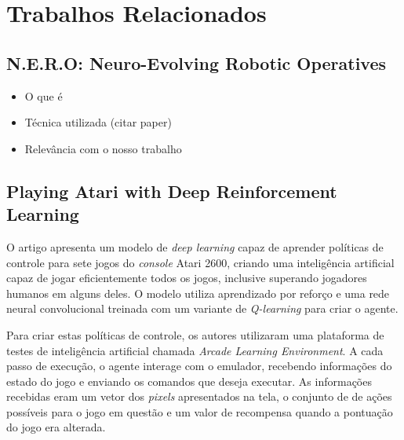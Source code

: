 \chapter{\label{chap:related-work}Trabalhos Relacionados}



\section{N.E.R.O: Neuro-Evolving Robotic Operatives}

\begin{mdframed}[backgroundcolor=green!20]
\begin{itemize}
    \item
        O que é
    \item
        Técnica utilizada (citar paper)
    \item
        Relevância com o nosso trabalho
\end{itemize}
\end{mdframed}

\section{Playing Atari with Deep Reinforcement Learning}
O artigo apresenta um modelo de \textit{deep learning} capaz de aprender
políticas de controle para sete jogos do \textit{console} Atari 2600, criando
uma inteligência artificial capaz de jogar eficientemente todos os jogos,
inclusive superando jogadores humanos em alguns deles. O modelo utiliza
aprendizado por reforço e uma rede neural convolucional treinada com um variante
de \textit{Q-learning} para criar o agente.

Para criar estas políticas de controle, os autores utilizaram uma plataforma de
testes de inteligência artificial chamada \textit{Arcade Learning Environment}.
A cada passo de execução, o agente interage com o emulador, recebendo
informações do estado do jogo e enviando os comandos que deseja executar. As
informações recebidas eram um vetor dos \textit{pixels} apresentados na tela, o
conjunto de de ações possíveis para o jogo em questão e um valor de recompensa
quando a pontuação do jogo era alterada.

